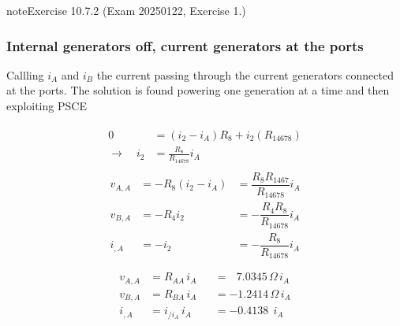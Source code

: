 \documentclass[letterpaper,10pt,italian]{jupyterBook}
\begin{document}
\begin{sphinxadmonition}{note}{Exercise 10.7.2 (Exam 2025\sphinxhyphen{}01\sphinxhyphen{}22, Exercise 1.)}
\subsubsection*{Internal generators off, current generators at the ports}

\sphinxAtStartPar
Callling \(i_A\) and \(i_B\) the current passing through the current generators connected at the ports. The solution is found powering one generation at a time and then exploiting PSCE

\sphinxAtStartPar
{}
\begin{equation*}
\begin{split}\begin{aligned}
  0 & = (i_2 - i_A) R_8 + i_2 (R_{14678}) \\
\rightarrow \quad 
 i_2 & = \frac{R_8}{R_{14678}} i_A
\end{aligned}\end{split}
\end{equation*}\begin{equation*}
\begin{split}\begin{aligned}
  v_{A,A} & =  -R_8 ( i_2 - i_A ) & = \dfrac{R_8 R_{1467}}{R_{14678}} i_A \\
  v_{B,A} & = - R_4 i_2 & = - \dfrac{R_4 R_8}{R_{14678}} i_A \\
    i_{,A}& = - i_2 & = - \dfrac{R_8}{R_{14678}} i_A \\
\end{aligned}\end{split}
\end{equation*}\begin{equation*}
\begin{split}\begin{aligned}
 v_{A,A} & = R_{AA}   \, i_A && = \ \ \ 7.0345  \, \Omega \, i_A \\ 
 v_{B,A} & = R_{BA}   \, i_A && = - 1.2414  \, \Omega \, i_A \\
   i_{,A} & = i_{/i_A}\, i_A && = - 0.4138 \ \  i_A \\
\end{aligned}\end{split}
\end{equation*}
\sphinxAtStartPar
{}




\end{sphinxadmonition}
\end{document}
